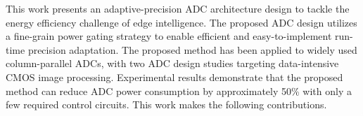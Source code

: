 
This work presents an adaptive-precision ADC architecture design to tackle the energy efficiency challenge of edge intelligence. 
The proposed ADC design utilizes a fine-grain power gating strategy to enable efficient and easy-to-implement run-time 
precision adaptation. The proposed method has been applied to widely used column-parallel ADCs, with two ADC design studies targeting 
data-intensive CMOS image processing. Experimental results demonstrate that the proposed method can reduce ADC power consumption 
by approximately 50\% with only a few required control circuits. This work makes the following contributions. 




